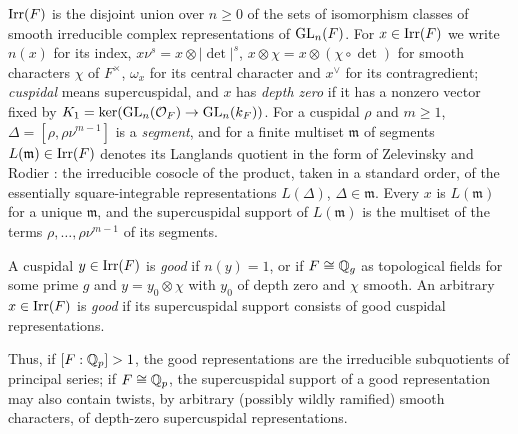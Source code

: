 \begin{definition}\label{def:galois:irr}
$\operatorname{Irr}(F)$ is the disjoint union over $n\ge0$ of the sets of isomorphism classes of smooth
irreducible complex representations of $\operatorname{GL}_n(F)$. For $x\in\operatorname{Irr}(F)$ we write $n(x)$ for its
index, $x\nu^s=x\otimes|\det|^s$, $x\otimes\chi=x\otimes(\chi\circ\det)$ for smooth characters $\chi$
of $F^\times$, $\omega_x$ for its central character and $x^\vee$ for its contragredient; \emph{cuspidal}
means supercuspidal, and $x$ has \emph{depth zero} if it has a nonzero vector fixed by
$K_1=\ker(\operatorname{GL}_n(\mathcal{O}_F)\to\operatorname{GL}_n(k_F))$. For a cuspidal $\rho$ and $m\ge1$, $\Delta=[\rho,\rho\nu^{m-1}]$
is a \emph{segment}, and for a finite multiset $\mathfrak m$ of segments $L(\mathfrak m)\in\operatorname{Irr}(F)$
denotes its Langlands quotient in the form of Zelevinsky and Rodier \cite{Zelevinsky1980,Rodier1982}:
the irreducible cosocle of the product, taken in a standard order, of the essentially
square-integrable representations $L(\Delta)$, $\Delta\in\mathfrak m$. Every $x$ is $L(\mathfrak m)$ for a
unique $\mathfrak m$, and the supercuspidal support of $L(\mathfrak m)$ is the multiset of the terms
$\rho,\dots,\rho\nu^{m-1}$ of its segments.

A cuspidal $y\in\operatorname{Irr}(F)$ is \emph{good} if $n(y)=1$, or if $F\cong\mathbb{Q}_g$ as topological fields
for some prime $g$ and $y=y_0\otimes\chi$ with $y_0$ of depth zero and $\chi$ smooth. An arbitrary
$x\in\operatorname{Irr}(F)$ is \emph{good} if its supercuspidal support consists of good cuspidal
representations.
\end{definition}

Thus, if $[F:\mathbb{Q}_p]>1$, the good representations are the irreducible subquotients of principal
series; if $F\cong\mathbb{Q}_p$, the supercuspidal support of a good representation may also contain twists,
by arbitrary (possibly wildly ramified) smooth characters, of depth-zero supercuspidal representations.

